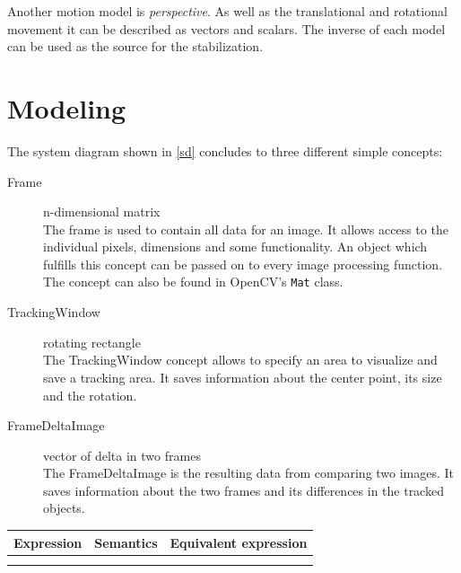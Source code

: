 Another motion model is \textit{perspective}. As well as the translational and rotational movement it can be described as vectors and scalars. The inverse of each model can be used as the source for the stabilization.


\section{Modeling}

\begin{figure}[h!]\centering
\end{figure}
The system diagram shown in \cref{sd}  concludes to three different simple concepts:
\begin{description}
    \item[Frame] n-dimensional matrix \\
        The frame is used to contain all data for an image. It allows access to the individual pixels, dimensions and some functionality. An object which fulfills this concept can be passed on to every image processing function. The concept can also be found in OpenCV's \texttt{Mat} class.
    \item[TrackingWindow] rotating rectangle \\
        The TrackingWindow concept allows to specify an area to visualize and save a tracking area. It saves information about the center point, its size and the rotation.
    \item[FrameDeltaImage] vector of delta in two frames \\
        The FrameDeltaImage is the resulting data from comparing two images. It saves information about the two frames and its differences in the tracked objects.
\end{description}

\begin{table}[ht]
\begin{tabular}{@{}lll@{}}
\toprule
\textbf{Expression} & \textbf{Semantics} & \textbf{Equivalent expression}\\ \midrule
   &  &  \\
   &  &  \\ \bottomrule
\end{tabular}
\end{table}


